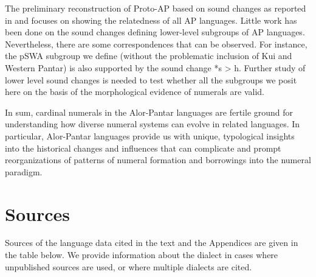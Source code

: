 The preliminary reconstruction of Proto-AP based on sound changes as reported in \citet{HoltonEtAl2012} and \citep{HoltonRobinsonTVhistory} focuses on showing the relatedness of all AP languages. Little work has been done on the sound changes defining lower-level subgroups of AP languages. Nevertheless, there are some correspondences that can be observed. For instance, the pSWA subgroup we define (without the problematic inclusion of Kui and Western Pantar) is also supported by the sound change *s {\textgreater} h. Further study of lower level sound changes is needed to test whether all the subgroups we posit here on the basis of the morphological evidence of numerals are valid. 

In sum, cardinal numerals in the Alor-Pantar languages are fertile ground for understanding how diverse numeral systems can evolve in related languages. In particular, Alor-Pantar languages provide us with unique, typological insights into the historical changes and influences that can complicate and prompt reorganizations of patterns of numeral formation and borrowings into the numeral paradigm.
 
 
 \clearpage
\section{Sources} \label{sec:6:9}
Sources of the language data cited in the text and the Appendices are given in the table below. We provide information about the dialect in cases where unpublished sources are used, or where multiple dialects are cited. \vspace{.2cm}



